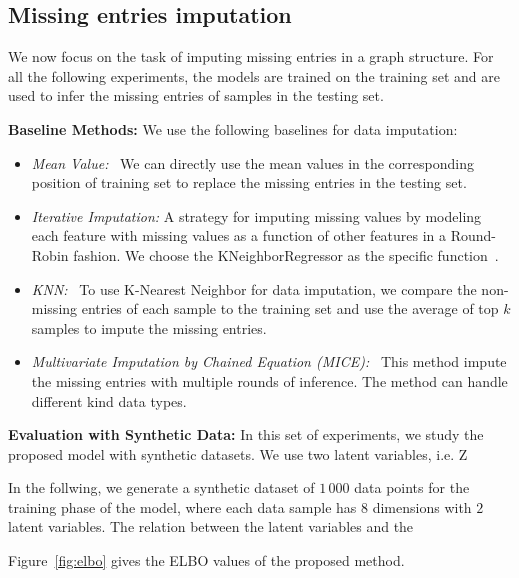 \documentclass{article} %
\newcommand{\belhal}[1]{{\color{red}{\bf\sf [BK: #1]}}}
\begin{document}
\subsection{Missing entries imputation}
We now focus on the task of imputing missing entries in a graph structure.
For all the following experiments, the models are trained on the training set and are used to infer the missing entries of samples in the testing set.

\textbf{Baseline Methods:} We use the following baselines for data imputation:
\begin{itemize}
\item \textit{Mean Value:} \ We can directly use the mean values in the corresponding position of training set to replace the missing entries in the testing set.  
\item \textit{Iterative Imputation:} A strategy for imputing missing values by modeling each feature with missing values as a function of other features in a Round-Robin fashion. 
\belhal{Don't need to cite sklearn here I believe. To confirm.} 
We choose the KNeighborRegressor as the specific function~\citep{scikit-learn}.
\item \textit{KNN:} \  To use K-Nearest Neighbor for data imputation,  we compare the non-missing entries of each sample to the training set and use the  average of top $k$ samples to impute the missing entries. 
\item \textit{Multivariate Imputation by Chained Equation (MICE):} \ This method impute the missing entries with multiple  rounds of inference. The method can handle different kind data types.
\end{itemize}
\textbf{Evaluation with Synthetic Data: }
In this set of experiments, we study the proposed model with synthetic datasets.
We use two latent variables, i.e. Z

In the follwing, we generate a synthetic dataset of $1\,000$ data points for the training phase of the model, where each data sample  has $8$ dimensions with $2$ latent variables.  The relation between the latent variables and the \belhal{to complete}


Figure~\ref{fig:elbo} gives the ELBO values of the proposed method. 
\end{document}
